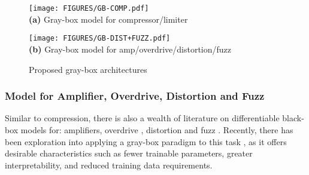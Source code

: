 \begin{figure*}[t]
    \begin{minipage}[b]{\textwidth}
        \centering
        \texttt{[image: FIGURES/GB-COMP.pdf]}
        \\\textbf{(a)} Gray-box model for compressor/limiter
        \label{fig:gb-comp}
    \end{minipage}%
    \vspace{5mm}
    \begin{minipage}[b]{1\textwidth}
        \centering
        \texttt{[image: FIGURES/GB-DIST+FUZZ.pdf]}
        \\\textbf{(b)} Gray-box model for amp/overdrive/distortion/fuzz
        \label{fig:gb-dist}
    \end{minipage}
    \caption{Proposed gray-box architectures}
    \label{fig:gb-comp_gb-dist}
\end{figure*}

\subsubsection{Model for Amplifier, Overdrive, Distortion and Fuzz}
\label{sec:gb-dist}

Similar to compression, there is also a wealth of literature on differentiable black-box models for: 
amplifiers,
\citep{
covert2013vacuum, 
zhang2018vacuum, 
schmitz2018real, 
schmitz2018nonlinear, 
schmitz2019objective, 
damskagg2019deep, 
wright2019real, 
wright2020real, 
wright2023adversarial} 
overdrive 
\citep{
mendoza2005emulating, 
ramirez2019modeling, 
damskagg2019real, 
wright2020real, 
chowdhury2020comparison, 
fasciani2024conditioning, 
yeh2024hyper, 
simionato2024comparative}, 
distortion 
\citep{
ramirez2019modeling, 
damskagg2019real, 
wright2019real, 
wright2020real, 
yoshimoto2020deep, 
yoshimoto2021wavenet} 
and fuzz 
\citep{comunita2023modelling}. 
Recently, there has been exploration into applying a gray-box paradigm to this task 
\citep{
kuznetsov2020differentiable, 
nercessian2021lightweight, 
colonel2022reverse, 
miklanek2023neural, 
yeh2024ddsp}, 
as it offers desirable characteristics such as fewer trainable parameters, greater interpretability, and reduced training data requirements.

